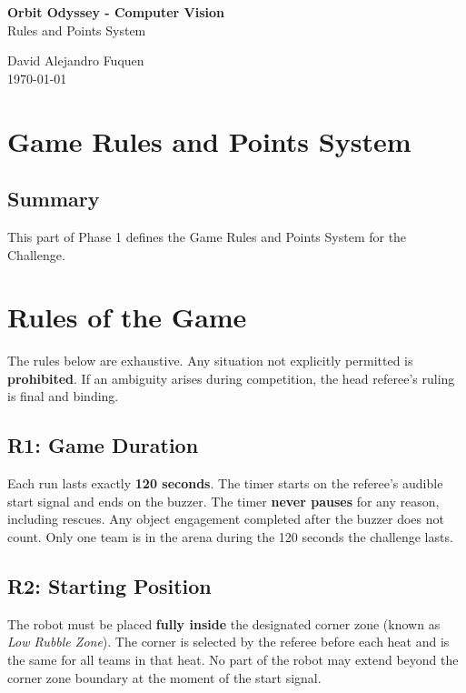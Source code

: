 \documentclass[a4]{article}
\begin{document}
\thispagestyle{fancy}

\begin{center}
    \textbf{\large Orbit Odyssey - Computer Vision} \\
    {Rules and Points System}
    
    \vspace{0.7em}

    David Alejandro Fuquen \\

    {\small \today}

\end{center}

\section*{Game Rules and Points System}

\subsection*{Summary}
This part of Phase 1 defines the Game Rules and Points System for the Challenge. 

\section*{Rules of the Game}
The rules below are exhaustive. Any situation not explicitly permitted is \textbf{prohibited}. If an ambiguity arises during competition, the head referee's ruling is final and binding.

\subsection*{R1: Game Duration}
Each run lasts exactly \textbf{120 seconds}. The timer starts on the referee's audible start signal and ends on the buzzer. The timer \textbf{never pauses} for any reason, including rescues. Any object engagement completed after the buzzer does not count. Only one team is in the arena during the 120 seconds the challenge lasts. 

\subsection*{R2: Starting Position}
The robot must be placed \textbf{fully inside} the designated corner zone (known as \textit{Low Rubble Zone}). The corner is selected by the referee before each heat and is the same for all teams in that heat. No part of the robot may extend beyond the corner zone boundary at the moment of the start signal.
\end{document}
